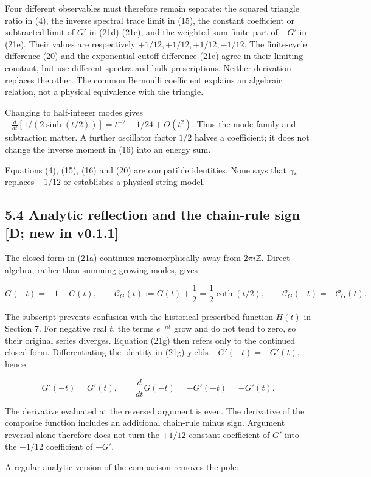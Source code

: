 \documentclass[11pt,a4paper]{article}
\begin{document}
Four different observables must therefore remain separate: the squared triangle ratio in (4), the inverse spectral trace limit in (15), the constant coefficient or subtracted limit of $G'$ in (21d)-(21e), and the weighted-sum finite part of $-G'$ in (21e). Their values are respectively $+1/12,+1/12,+1/12,-1/12$. The finite-cycle difference (20) and the exponential-cutoff difference (21e) agree in their limiting constant, but use different spectra and bulk prescriptions. Neither derivation replaces the other. The common Bernoulli coefficient explains an algebraic relation, not a physical equivalence with the triangle.

Changing to half-integer modes gives
$-\frac d{dt}[1/(2\sinh(t/2))]=t^{-2}+1/24+O(t^2)$.
Thus the mode family and subtraction matter. A further oscillator factor $1/2$ halves a coefficient; it does not change the inverse moment in (16) into an energy sum.


Equations (4), (15), (16) and (20) are compatible identities. None says that $\gamma_*$ replaces $-1/12$ or establishes a physical string model.


\subsection*{5.4 Analytic reflection and the chain-rule sign [D; new in v0.1.1]}

The closed form in (21a) continues meromorphically away from $2\pi i\mathbb Z$. Direct algebra, rather than summing growing modes, gives

\[
G(-t)=-1-G(t),\qquad
\mathcal C_G(t):=G(t)+\frac12=\frac12\coth(t/2),\qquad
\mathcal C_G(-t)=-\mathcal C_G(t). \tag{21g}
\]

The subscript prevents confusion with the historical prescribed function $H(t)$ in Section 7. For negative real $t$, the terms $e^{-nt}$ grow and do not tend to zero, so their original series diverges. Equation (21g) then refers only to the continued closed form. Differentiating the identity in (21g) yields $-G'(-t)=-G'(t)$, hence

\[
G'(-t)=G'(t),\qquad \frac{d}{dt}G(-t)=-G'(-t)=-G'(t). \tag{21h}
\]

The derivative evaluated at the reversed argument is even. The derivative of the composite function includes an additional chain-rule minus sign. Argument reversal alone therefore does not turn the $+1/12$ constant coefficient of $G'$ into the $-1/12$ coefficient of $-G'$.

A regular analytic version of the comparison removes the pole:
\end{document}
